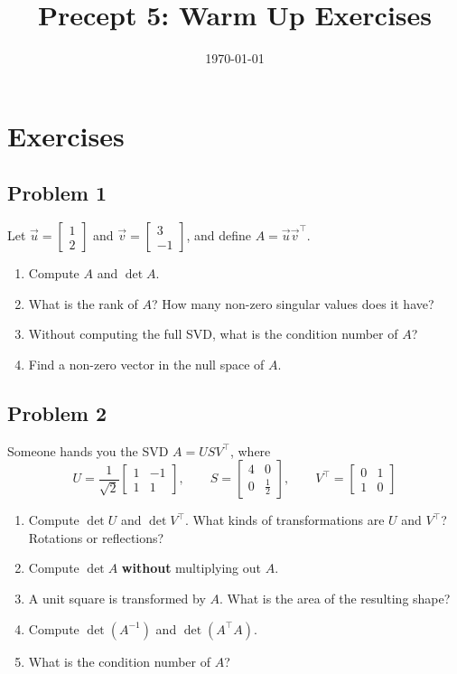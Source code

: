 \documentclass[11pt]{article}
\title{Precept 5: Warm Up Exercises}
\date{\today}
\begin{document}
\maketitle
\thispagestyle{fancy}

\section*{Exercises}
\subsection*{Problem 1}
Let $\vec{u}=\begin{bmatrix}
    1\\ 2
\end{bmatrix}$ and $\vec{v}=\begin{bmatrix}
    3\\ -1
\end{bmatrix}$, and define $A=\vec{u}\vec{v}^\top$.
\begin{enumerate}
    \item[(a)] Compute $A$ and $\det A$.
    \item[(b)] What is the rank of $A$? How many non-zero singular values does it have?
    \item[(c)] Without computing the full SVD, what is the condition number of $A$?
    \item[(d)] Find a non-zero vector in the null space of $A$. 
\end{enumerate}

\subsection*{Problem 2}
Someone hands you the SVD $A=USV^\top$, where
\[
U=\frac{1}{\sqrt{2}}\begin{bmatrix}
    1 & -1 \\ 1 & 1
\end{bmatrix},\qquad S=\begin{bmatrix}
    4 & 0 \\ 0 & \frac{1}{2}
\end{bmatrix}, \qquad V^\top = \begin{bmatrix}
    0 & 1 \\ 1 & 0 
\end{bmatrix}
\]
\begin{enumerate}
    \item[(a)] Compute $\det U$ and $\det V^\top$. What kinds of transformations are $U$ and $V^\top$? Rotations or reflections?
    \item[(b)] Compute $\det A$ \textbf{without} multiplying out $A$.
    \item[(c)] A unit square is transformed by $A$. What is the area of the resulting shape?
    \item[(d)] Compute $\det\left(A^{-1}\right)$ and $\det \left(A^\top A\right)$.
    \item[(e)] What is the condition number of $A$?
\end{enumerate}
\end{document}
